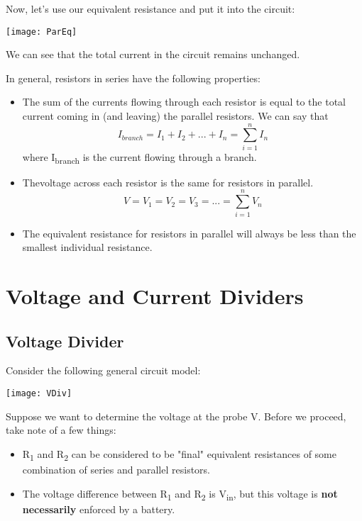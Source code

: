 \documentclass[12pt,letterpaper]{article}
\begin{document}
Now, let's use our equivalent resistance and put it into the circuit:
\begin{center}
\texttt{[image: ParEq]}
\end{center}

We can see that the total current in the circuit remains unchanged.

In general, resistors in series have the following properties:
\begin{itemize}
\item The sum of the currents flowing through each resistor is equal to the total current coming in (and leaving) the parallel resistors. We can say that 
	\begin{equation} I_{branch} = I_{1} + I_{2} + ... +I_{n} =  \sum_{i=1}^{n} I_{n} \end{equation}
	where I\textsubscript{branch} is the current flowing through a branch.
\item Thevoltage across each resistor is the same for resistors in parallel.
	\begin{equation} V = V_{1} = V_{2} = V_{3} = ... = \sum_{i=1}^{n} V_{n} \end{equation}

\item The equivalent resistance for resistors in parallel will always be less than the smallest individual resistance.
\end{itemize}

\section{Voltage and Current Dividers}
\subsection{Voltage Divider}
Consider the following general circuit model:

\begin{center}
\texttt{[image: VDiv]}
\end{center}

Suppose we want to determine the voltage at the probe V.  Before we proceed, take note of a few things:
\begin{itemize}
\item R\textsubscript{1} and R\textsubscript{2} can be considered to be "final" equivalent resistances of some combination of series and parallel resistors.
\item The voltage difference between R\textsubscript{1} and R\textsubscript{2} is V\textsubscript{in}, but this voltage is \textbf{not necessarily} enforced by a battery.
\end{itemize}
\end{document}
